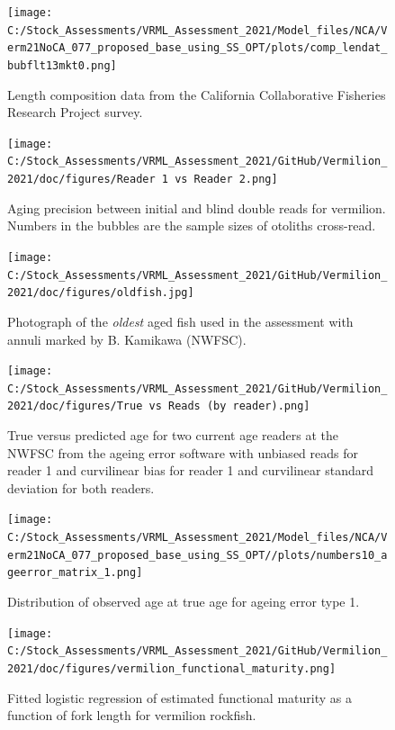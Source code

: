 \documentclass[
  english,
  a4paper,
]{article}
\begin{document}
\begin{figure}
\centering
\texttt{[image: C:/Stock\_Assessments/VRML\_Assessment\_2021/Model\_files/NCA/Verm21NoCA\_077\_proposed\_base\_using\_SS\_OPT/plots/comp\_lendat\_bubflt13mkt0.png]}
\caption{Length composition data from the California Collaborative Fisheries Research Project survey.\label{fig:len-data-CCFRP}}
\end{figure}

\begin{figure}
\centering
\texttt{[image: C:/Stock\_Assessments/VRML\_Assessment\_2021/GitHub/Vermilion\_2021/doc/figures/Reader 1 vs Reader 2.png]}
\caption{Aging precision between initial and blind double reads for vermilion.
Numbers in the bubbles are the sample sizes of otoliths cross-read.\label{fig:reader1reader2}}
\end{figure}

\begin{figure}
\centering
\texttt{[image: C:/Stock\_Assessments/VRML\_Assessment\_2021/GitHub/Vermilion\_2021/doc/figures/oldfish.jpg]}
\caption{Photograph of the \emph{oldest} aged fish used in the assessment with annuli marked by B. Kamikawa (NWFSC).\label{fig:oldfish}}
\end{figure}

\begin{figure}
\centering
\texttt{[image: C:/Stock\_Assessments/VRML\_Assessment\_2021/GitHub/Vermilion\_2021/doc/figures/True vs Reads (by reader).png]}
\caption{True versus predicted age for two current age readers at the NWFSC
from the ageing error software with unbiased reads for reader 1 and curvilinear
bias for reader 1 and curvilinear standard deviation for both readers.\label{fig:truereads}}
\end{figure}

\begin{figure}
\centering
\texttt{[image: C:/Stock\_Assessments/VRML\_Assessment\_2021/Model\_files/NCA/Verm21NoCA\_077\_proposed\_base\_using\_SS\_OPT//plots/numbers10\_ageerror\_matrix\_1.png]}
\caption{Distribution of observed age at true age for ageing error type 1.\label{fig:ageerror}}
\end{figure}

\begin{figure}
\centering
\texttt{[image: C:/Stock\_Assessments/VRML\_Assessment\_2021/GitHub/Vermilion\_2021/doc/figures/vermilion\_functional\_maturity.png]}
\caption{Fitted logistic regression of estimated functional maturity as a function of fork length for vermilion rockfish.\label{fig:functional-maturity}}
\end{figure}
\end{document}
